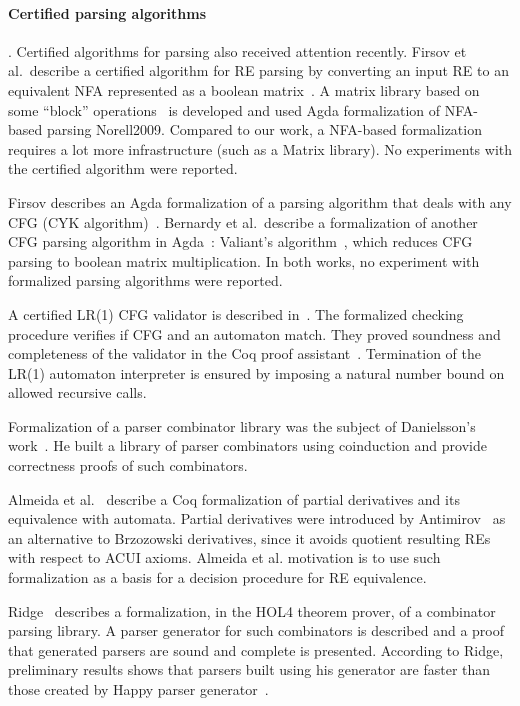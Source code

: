 \documentclass[sigplan, anonymous, review]{acmart}
\theoremstyle{definition}
\begin{document}
\paragraph{Certified parsing algorithms}. Certified algorithms for
parsing also received attention recently. Firsov et al.~describe a
certified algorithm for RE parsing by converting an input RE to an
equivalent NFA represented as a boolean matrix~\cite{FirsovU13}. A
matrix library based on some ``block'' operations~\cite{MacedoO13} is
developed and used Agda formalization of NFA-based parsing
{Norell2009}. Compared to our work, a NFA-based formalization requires
a lot more infrastructure (such as a Matrix library). No experiments
with the certified algorithm were reported.

Firsov describes an Agda formalization of a parsing algorithm that
deals with any CFG (CYK algorithm)~\cite{Firsov2014}. Bernardy
et al.~describe a formalization of another CFG parsing algorithm in
Agda~\cite{BernardyJ16}: Valiant's algorithm~\cite{Valiant1975}, which
reduces CFG parsing to boolean matrix multiplication. In both works,
no experiment with formalized parsing algorithms were reported.

A certified LR(1) CFG validator is described
in~\cite{Jourdan2012}. The formalized checking procedure verifies if
CFG and an automaton match. They proved soundness and completeness of
the validator in the Coq proof
assistant~\cite{Bertot2010}. Termination of the LR(1) automaton
interpreter is ensured by imposing a natural number bound on
allowed recursive calls.

Formalization of a parser combinator library was the subject of
Danielsson's work~\cite{Danielsson2010}. He built a library of parser
combinators using coinduction and provide correctness proofs of such
combinators.

Almeida et al.~\cite{AlmeidaMPS10} describe a Coq formalization of
partial derivatives and its equivalence with automata. Partial
derivatives were introduced by Antimirov~\cite{Antimirov91} as an
alternative to Brzozowski derivatives, since it avoids quotient
resulting REs with respect to ACUI axioms. Almeida et al. motivation
is to use such formalization as a basis for a decision procedure for
RE equivalence.

Ridge~\cite{Ridge2011} describes a formalization, in the HOL4 theorem
prover, of a combinator parsing library. A parser generator for such
combinators is described and a proof that generated parsers are sound
and complete is presented.  According to Ridge, preliminary results
shows that parsers built using his generator are faster than those
created by Happy parser generator~\cite{Happy}.
\end{document}
